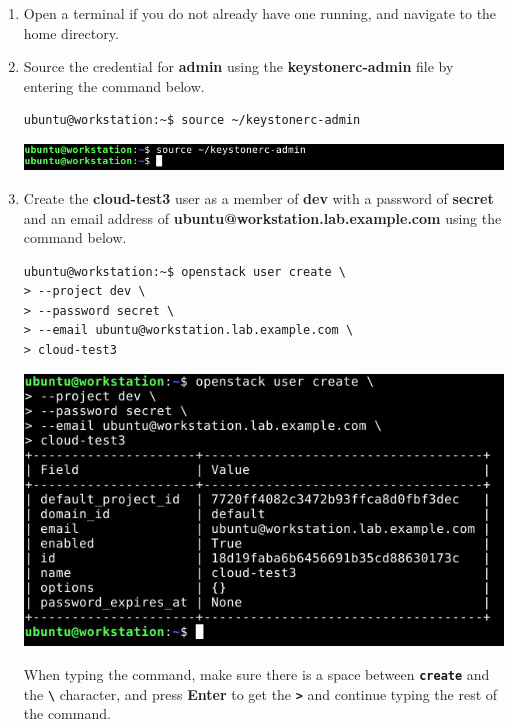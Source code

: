 \documentclass[letterpaper, 12pt]{article}
\begin{document}
\begin{enumerate}
    \item Open a terminal if you do not already have one running, and navigate to the home directory.
    
    \item Source the credential for \textbf{admin} using the \textbf{keystonerc-admin} file by entering the command
    below.
\begin{lstlisting}
ubuntu@workstation:~$ source ~/keystonerc-admin
\end{lstlisting}

    \begin{center}
        \includegraphics[width=\linewidth]{images/part4/step2.png}
    \end{center}

    \item Create the \textbf{cloud-test3} user as a member of \textbf{dev} with a password of \textbf{secret} and an
    email address of \textbf{ubuntu@workstation.lab.example.com} using the command below.
\begin{lstlisting}
ubuntu@workstation:~$ openstack user create \
> --project dev \
> --password secret \
> --email ubuntu@workstation.lab.example.com \
> cloud-test3
\end{lstlisting}

    \begin{center}
        \includegraphics[width=\linewidth]{images/part4/step3.png}
    \end{center}

    \begin{tipbox}{}
        When typing the command, make sure there is a space between \textbf{\texttt{create}} and the
        \textbf{\texttt{\textbackslash}} character, and press \textbf{Enter} to get the \textbf{\texttt{>}} and continue
        typing the rest of the command.
    \end{tipbox}


\end{enumerate}
\end{document}
